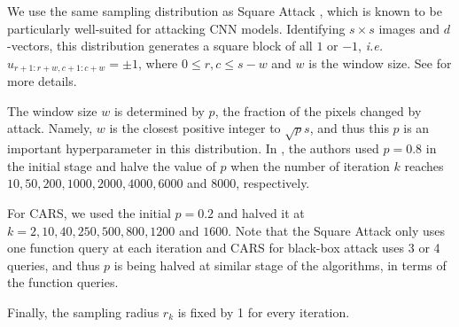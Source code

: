 We use the same sampling distribution as Square Attack \cite{andriushchenko2020square}, which is known to be particularly well-suited for attacking CNN models. Identifying $s\times s$ images and $d$-vectors,
this distribution generates a square block of all $1$ or $-1$, {\em i.e.} $u_{r+1:r+w, c+1:c+w} = \pm 1$, where $0 \leq r, c \leq s-w$ and $w$ is the window size. See \cite{andriushchenko2020square} for more details.

The window size $w$ is determined by $p$, the fraction of the pixels changed by attack. Namely, $w$ is the closest positive integer to $\sqrt{p}s$, and thus this $p$ is an important hyperparameter in this distribution.
In \cite{andriushchenko2020square}, the authors used $p = 0.8$ in the initial stage and halve the value of $p$ when the number of iteration $k$ reaches $10, 50, 200, 1000, 2000, 4000, 6000$ and $8000$, respectively.

For CARS, we used the initial $p=0.2$ and halved it at $k = 2, 10, 40, 250, 500, 800, 1200$ and $1600$. Note that the Square Attack only uses one function query at each iteration and CARS for black-box attack uses 3 or 4 queries, and thus $p$ is being halved at similar stage of the algorithms, in terms of the function queries.

Finally, the sampling radius $r_k$ is fixed by 1 for every iteration.

